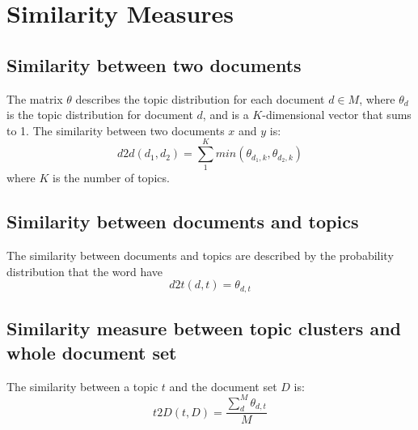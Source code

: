 \section{Similarity Measures}\label{sec:similarity}
\subsection{Similarity between two documents}
The matrix $\theta$ describes the topic distribution for each document $d \in M$, where $\theta_d$ is the topic distribution for document $d$, and is a $K$-dimensional vector that sums to 1.
The similarity between two documents $x$ and $y$ is:
$$ d2d(d_1, d_2) = \sum_{1}^{K} min(\theta_{d_1,k}, \theta_{d_2,k})$$
where $K$ is the number of topics.

\subsection{Similarity between documents and topics}
The similarity between documents and topics are described by the probability distribution that the word have
$$ d2t(d,t) = \theta_{d,t}$$

\subsection{Similarity measure between topic clusters and whole document set}
The similarity between a topic $t$ and the document set $D$ is:
$$ t2D(t, D) = \frac{\sum_{d}^{M} \theta_{d,t}}{M} $$